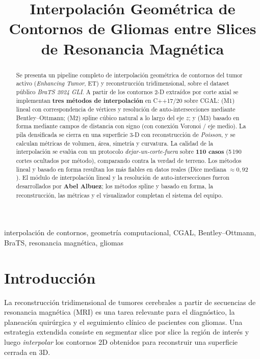 \documentclass[conference]{IEEEtran}
\title{Interpolación Geométrica de Contornos de Gliomas entre
Slices de Resonancia Magnética}
\author{\IEEEauthorblockN{Abel Albuez, Santiago Gil Gallego y
Jesús Alberto}
\IEEEauthorblockA{Maestría en Ingeniería de Sistemas y Computación\\
Pontificia Universidad Javeriana, Bogotá D.C., Colombia\\
Profesor: Leonardo Flórez-Valencia \quad
Geometría Computacional \quad 2026\\
Repositorio: \url{https://github.com/AbelAlbuez/computational-geometry-cgal}}}
\begin{document}
\maketitle

\begin{abstract}
Se presenta un pipeline completo de interpolación geométrica de
contornos del tumor activo (\textit{Enhancing Tumor}, ET) y
reconstrucción tridimensional, sobre el dataset público
\textit{BraTS 2024 GLI}. A partir de los contornos 2-D extraídos por
corte axial se implementan \textbf{tres métodos de interpolación} en
C++17/20 sobre CGAL: (M1) lineal con correspondencia de vértices y
resolución de auto-intersecciones mediante Bentley--Ottmann; (M2)
spline cúbico natural a lo largo del eje $z$; y (M3) basado en forma
mediante campos de distancia con signo (con conexión Voronoi / eje
medio). La pila densificada se cierra en una superficie 3-D con
reconstrucción de \emph{Poisson}, y se calculan métricas de volumen,
área, simetría y curvatura. La calidad de la interpolación se evalúa con
un protocolo \emph{dejar-un-corte-fuera} sobre \textbf{110 casos}
(5\,190 cortes ocultados por método), comparando contra la verdad de
terreno. Los métodos lineal y basado en forma resultan los más fiables
en datos reales (Dice mediana $\approx 0{,}92$). El módulo de
interpolación lineal y la resolución de auto-intersecciones fueron
desarrollados por \textbf{Abel Albuez}; los métodos spline y basado en
forma, la reconstrucción, las métricas y el visualizador completan el
sistema del equipo.
\end{abstract}

\begin{IEEEkeywords}
interpolación de contornos, geometría computacional, CGAL,
Bentley--Ottmann, BraTS, resonancia magnética, gliomas
\end{IEEEkeywords}

\section{Introducción}
La reconstrucción tridimensional de tumores cerebrales a partir
de secuencias de resonancia magnética (MRI) es una tarea
relevante para el diagnóstico, la planeación quirúrgica y el
seguimiento clínico de pacientes con gliomas. Una estrategia
extendida consiste en segmentar slice por slice la región de
interés y luego \emph{interpolar} los contornos 2D obtenidos
para reconstruir una superficie cerrada en 3D.
\end{document}
